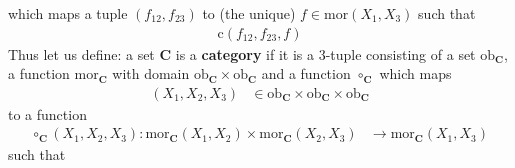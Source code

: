 which maps a tuple $(f_{12},f_{23})$ to (the unique) $f  \in \mathrm{mor}(X_{1},X_{3})$ such that
\begin{align*}
\mathrm{c}(f_{12},f_{23},f)
\end{align*}
Thus let us define: a set $\mathbf{C}$ is a \textbf{category} if it is a $3$-tuple consisting of a set $\mathrm{ob}_{\mathbf{C}}$, a function $\mathrm{mor}_{\mathbf{C}}$ with domain $\mathrm{ob}_{\mathbf{C}} \times \mathrm{ob}_{\mathbf{C}}$ and a function $\circ_{\mathbf{C}}$ which maps
\begin{align*}
  (X_{1},X_{2},X_{3})
  &\in
  \mathrm{ob}_{\mathbf{C}}
  \times
  \mathrm{ob}_{\mathbf{C}}
  \times
  \mathrm{ob}_{\mathbf{C}}
\end{align*}
to a function
\begin{align*}
  \circ_{\mathbf{C}}(X_{1},X_{2},X_{3})
  \colon
  \mathrm{mor}_{\mathbf{C}}(X_{1},X_{2})
  \times
  \mathrm{mor}_{\mathbf{C}}(X_{2},X_{3})
  &\rightarrow
  \mathrm{mor}_{\mathbf{C}}(X_{1},X_{3})
\end{align*}
such that
